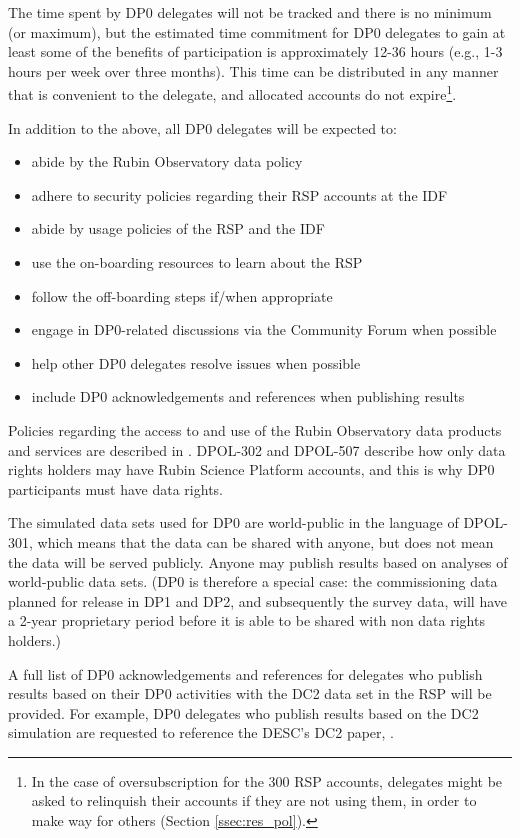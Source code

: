 \documentclass[DM,lsstdraft,authoryear,toc]{lsstdoc}
\begin{document}
The time spent by DP0 delegates will not be tracked and there is no minimum (or maximum), but the estimated time commitment for DP0 delegates to gain at least some of the benefits of participation is approximately 12-36 hours (e.g., 1-3 hours per week over three months).
This time can be distributed in any manner that is convenient to the delegate, and allocated accounts do not expire\footnote{In the case of oversubscription for the 300 RSP accounts, delegates might be asked to relinquish their accounts if they are not using them, in order to make way for others (Section \ref{ssec:res_pol}).}.

In addition to the above, all DP0 delegates will be expected to:
\begin{itemize}
\item abide by the Rubin Observatory data policy 
\item adhere to security policies regarding their RSP accounts at the IDF
\item abide by usage policies of the RSP and the IDF
\item use the on-boarding resources to learn about the RSP
\item follow the off-boarding steps if/when appropriate
\item engage in DP0-related discussions via the Community Forum when possible
\item help other DP0 delegates resolve issues when possible
\item include DP0 acknowledgements and references when publishing results
\end{itemize}

Policies regarding the access to and use of the Rubin Observatory data products and services are described in .
DPOL-302 and DPOL-507 describe how only data rights holders may have Rubin Science Platform accounts, and this is why DP0 participants must have data rights.

The simulated data sets used for DP0 are world-public in the language of DPOL-301, which means that the data can be shared with anyone, but does not mean the data will be served publicly.
Anyone may publish results based on analyses of world-public data sets.
(DP0 is therefore a special case: the commissioning data planned for release in DP1 and DP2, and subsequently the survey data, will have a 2-year proprietary period before it is able to be shared with non data rights holders.)

A full list of DP0 acknowledgements and references for delegates who publish results based on their DP0 activities with the DC2 data set in the RSP will be provided. 
For example, DP0 delegates who publish results based on the DC2 simulation are requested to reference the DESC's DC2 paper, \citet{2020arXiv201005926L}.
\end{document}

